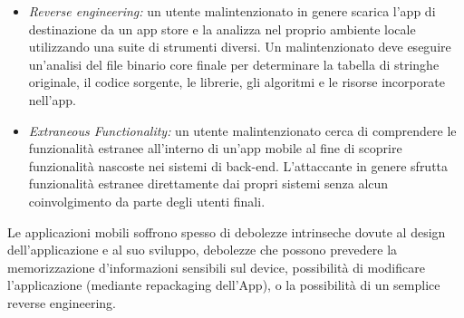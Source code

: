 \begin{itemize}
    \item \textit{Reverse engineering:}
    un utente malintenzionato in genere scarica l'app di destinazione da un app store e la analizza nel proprio ambiente locale utilizzando una suite di strumenti diversi. Un malintenzionato deve eseguire un'analisi del file binario core finale per determinare la tabella di stringhe originale, il codice sorgente, le librerie, gli algoritmi e le risorse incorporate nell'app.
    \item \textit{Extraneous Functionality:}
    un utente malintenzionato cerca di comprendere le funzionalità estranee all'interno di un'app mobile  al fine di scoprire funzionalità nascoste nei sistemi di back-end.
    L'attaccante in genere sfrutta funzionalità estranee direttamente dai propri sistemi senza alcun coinvolgimento da parte degli utenti finali.
\end{itemize}
Le applicazioni mobili soffrono spesso di debolezze intrinseche dovute al design dell'applicazione e al suo sviluppo, debolezze che possono prevedere la memorizzazione d'informazioni sensibili sul device, possibilità di modificare l'applicazione (mediante \gls{repackaging} dell'App), o la possibilità di un semplice reverse engineering.